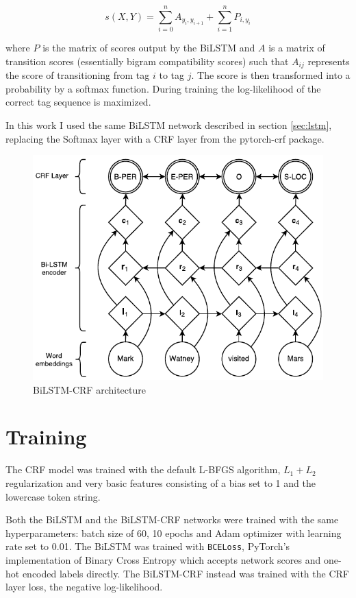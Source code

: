 \documentclass[journal]{IEEEtran}
\begin{document}
\begin{equation}
    s(X,Y) = \sum^n_{i=0} A_{y_i,y_{i+1}} + \sum^n_{i=1} P_{i,y_i}
\end{equation}

\noindent where $P$ is the matrix of scores output by the BiLSTM and $A$ is a matrix of transition scores (essentially bigram compatibility scores) such that $A_{ij}$ represents the score of transitioning from tag $i$ to tag $j$. The score is then transformed into a probability by a softmax function.
During training the log-likelihood of the correct tag sequence is maximized.

In this work I used the same BiLSTM network described in section \ref{sec:lstm}, replacing the Softmax layer with a CRF layer from the pytorch-crf package.

\begin{figure}
    \centering
    \includegraphics[scale=0.4]{Figures/bilstm-crf.png}
    \caption{BiLSTM-CRF architecture}
    \label{fig:bilstm-crf-arch}
\end{figure}


\section{Training}
The CRF model was trained with the default L-BFGS algorithm, $L_1 + L_2$ regularization and very basic features consisting of a bias set to 1 and the lowercase token string.

Both the BiLSTM and the BiLSTM-CRF networks were trained with the same hyperparameters: batch size of 60, 10 epochs and Adam optimizer with learning rate set to 0.01. The BiLSTM was trained with \texttt{BCELoss}, PyTorch's implementation of Binary Cross Entropy which accepts network scores and one-hot encoded labels directly. The BiLSTM-CRF instead was trained with the CRF layer loss, the negative log-likelihood.
\end{document}
